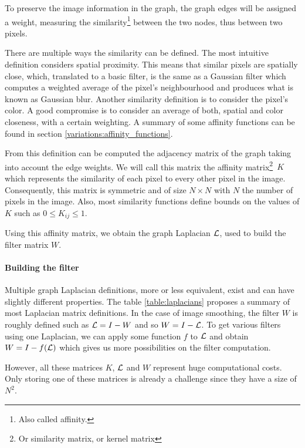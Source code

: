 To preserve the image information in the graph, the graph edges will be assigned a weight, measuring the similarity\footnote{Also called affinity.} between the two nodes, thus between two pixels.

There are multiple ways the similarity can be defined.
The most intuitive definition considers spatial proximity.
This means that similar pixels are spatially close, which, translated to a basic filter, is the same as a Gaussian filter which computes a weighted average of the pixel's neighbourhood and produces what is known as Gaussian blur.
Another similarity definition is to consider the pixel's color.
A good compromise is to consider an average of both, spatial and color closeness, with a certain weighting.
A summary of some affinity functions can be found in section \ref{variations:affinity_functions}.

From this definition can be computed the adjacency matrix of the graph taking into account the edge weights.
We will call this matrix the affinity matrix\footnote{Or similarity matrix, or kernel matrix}\ \(K\) which represents the similarity of each pixel to every other pixel in the image.
Consequently, this matrix is symmetric and of size \(N \times N\) with \(N\) the number of pixels in the image.
Also, most similarity functions define bounds on the values of \(K\) such as \(0 \le K_{ij} \le 1\).

Using this affinity matrix, we obtain the graph Laplacian \(\operatorname{\mathcal{L}}\), used to build the filter matrix \(W\).

\paragraph{Building the filter}

Multiple graph Laplacian definitions, more or less equivalent, exist and can have slightly different properties.
The table \ref{table:laplacians} proposes a summary of most Laplacian matrix definitions.
In the case of image smoothing, the filter \(W\) is roughly defined such as \(\operatorname{\mathcal{L}} = I - W\) \cite{siam_slides_2016} and so \(W = I - \operatorname{\mathcal{L}}\).
To get various filters using one Laplacian, we can apply some function \(f\) to \(\operatorname{\mathcal{L}}\) and obtain \(W = I - f(\operatorname{\mathcal{L}})\) which gives us more possibilities on the filter computation.

However, all these matrices \(K\), \(\operatorname{\mathcal{L}}\) and \(W\) represent huge computational costs.
Only storing one of these matrices is already a challenge since they have a size of \(N^2\).


